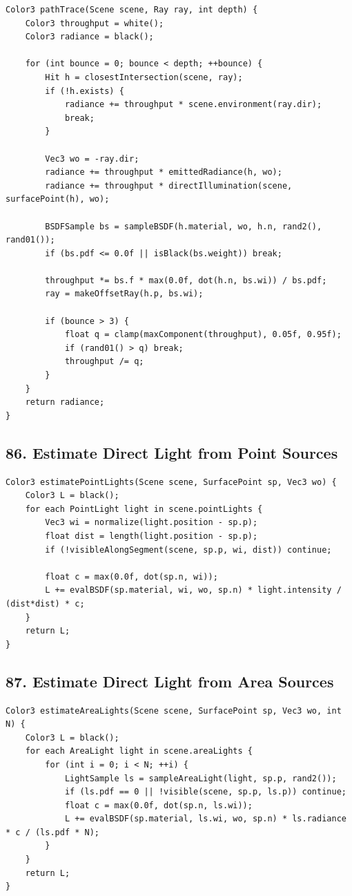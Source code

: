 \documentclass[10pt,letterpaper]{article}
\begin{document}
\begin{verbatim}
Color3 pathTrace(Scene scene, Ray ray, int depth) {
    Color3 throughput = white();
    Color3 radiance = black();

    for (int bounce = 0; bounce < depth; ++bounce) {
        Hit h = closestIntersection(scene, ray);
        if (!h.exists) {
            radiance += throughput * scene.environment(ray.dir);
            break;
        }

        Vec3 wo = -ray.dir;
        radiance += throughput * emittedRadiance(h, wo);
        radiance += throughput * directIllumination(scene, surfacePoint(h), wo);

        BSDFSample bs = sampleBSDF(h.material, wo, h.n, rand2(), rand01());
        if (bs.pdf <= 0.0f || isBlack(bs.weight)) break;

        throughput *= bs.f * max(0.0f, dot(h.n, bs.wi)) / bs.pdf;
        ray = makeOffsetRay(h.p, bs.wi);

        if (bounce > 3) {
            float q = clamp(maxComponent(throughput), 0.05f, 0.95f);
            if (rand01() > q) break;
            throughput /= q;
        }
    }
    return radiance;
}
\end{verbatim}

\subsection{86. Estimate Direct Light from Point Sources}

\begin{verbatim}
Color3 estimatePointLights(Scene scene, SurfacePoint sp, Vec3 wo) {
    Color3 L = black();
    for each PointLight light in scene.pointLights {
        Vec3 wi = normalize(light.position - sp.p);
        float dist = length(light.position - sp.p);
        if (!visibleAlongSegment(scene, sp.p, wi, dist)) continue;

        float c = max(0.0f, dot(sp.n, wi));
        L += evalBSDF(sp.material, wi, wo, sp.n) * light.intensity / (dist*dist) * c;
    }
    return L;
}
\end{verbatim}

\subsection{87. Estimate Direct Light from Area Sources}

\begin{verbatim}
Color3 estimateAreaLights(Scene scene, SurfacePoint sp, Vec3 wo, int N) {
    Color3 L = black();
    for each AreaLight light in scene.areaLights {
        for (int i = 0; i < N; ++i) {
            LightSample ls = sampleAreaLight(light, sp.p, rand2());
            if (ls.pdf == 0 || !visible(scene, sp.p, ls.p)) continue;
            float c = max(0.0f, dot(sp.n, ls.wi));
            L += evalBSDF(sp.material, ls.wi, wo, sp.n) * ls.radiance * c / (ls.pdf * N);
        }
    }
    return L;
}
\end{verbatim}
\end{document}
